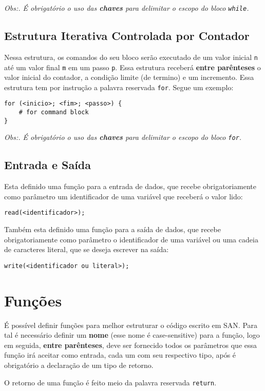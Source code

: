 \documentclass[a4paper,12pt]{article}
\begin{document}
\textit{Obs:. É obrigatório o uso das \textbf{chaves} para delimitar o escopo do bloco \texttt{while}.}

\subsection{Estrutura Iterativa Controlada por Contador}
Nessa estrutura, os comandos do seu bloco serão executado de um valor inicial \texttt{n} até um
valor final \texttt{m} em um passo \texttt{p}. Essa estrutura receberá \textbf{entre parênteses}
o valor inicial do contador, a condição limite (de termino) e um incremento. Essa estrutura tem
por instrução a palavra reservada \texttt{for}. Segue um exemplo:
\begin{lstlisting}
for (<inicio>; <fim>; <passo>) {
    # for command block
}
\end{lstlisting}

\textit{Obs:. É obrigatório o uso das \textbf{chaves} para delimitar o escopo do bloco \texttt{for}.}

\subsection{Entrada e Saída}
Esta definido uma função para a entrada de dados, que recebe obrigatoriamente como parâmetro
um identificador de uma variável que receberá o valor lido:
\begin{lstlisting}
read(<identificador>);
\end{lstlisting}

Também esta definido uma função para a saída de dados, que recebe obrigatoriamente como parâmetro
o identificador de uma variável ou uma cadeia de caracteres literal, que se deseja escrever na saída:
\begin{lstlisting}
write(<identificador ou literal>);
\end{lstlisting}

\section{Funções}
É possível definir funções para melhor estruturar o código escrito em SAN. Para tal é necessário
definir um \textbf{nome} (esse nome é case-sensitive) para a função, logo em seguida,
\textbf{entre parênteses}, deve ser fornecido todos os parâmetros que essa função irá aceitar como
entrada, cada um com seu respectivo tipo, após é obrigatório a declaração de um tipo de retorno.

O retorno de uma função é feito meio da palavra reservada \texttt{return}.
\end{document}
